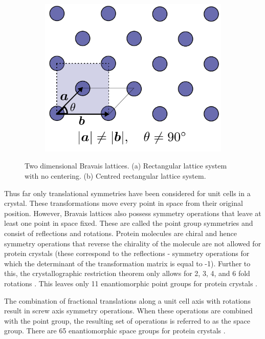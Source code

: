 \begin{figure}
\begin{subfigure}[b]{0.45\textwidth}
                    \includegraphics[width=\textwidth]{figures/introduction/centredrectangularbravaislattice.pdf}
                    \caption{}
                    \label{fig:2D centred rectangular Bravais lattice}
            \end{subfigure}
            \caption{Two dimensional Bravais lattices. (a) Rectangular lattice system with no centering. (b) Centred rectangular lattice system.}
    		\label{fig:2D Bravais lattices}
        \end{figure}

        Thus far only translational symmetries have been considered for unit cells in a crystal.
        These transformations move every point in space from their original position.
        However, Bravais lattices also possess symmetry operations that leave at least one point in space fixed.
        These are called the point group symmetries and consist of reflections and rotations.
        Protein molecules are chiral and hence symmetry operations that reverse the chirality of the molecule are not allowed for protein crystals (these correspond to the reflections - symmetry operations for which the determinant of the transformation matrix is equal to -1).
        Further to this, the crystallographic restriction theorem only allows for 2, 3, 4, and 6 fold rotations \cite[p~63]{coxeter1973regular}.
        This leaves only 11 enantiomorphic point groups for protein crystals \cite{drenth2012}.

        The combination of fractional translations along a unit cell axis with rotations result in screw axis symmetry operations.
        When these operations are combined with the point group, the resulting set of operations is referred to as the space group.
        There are 65 enantiomorphic space groups for protein crystals \cite{drenth2012}.

